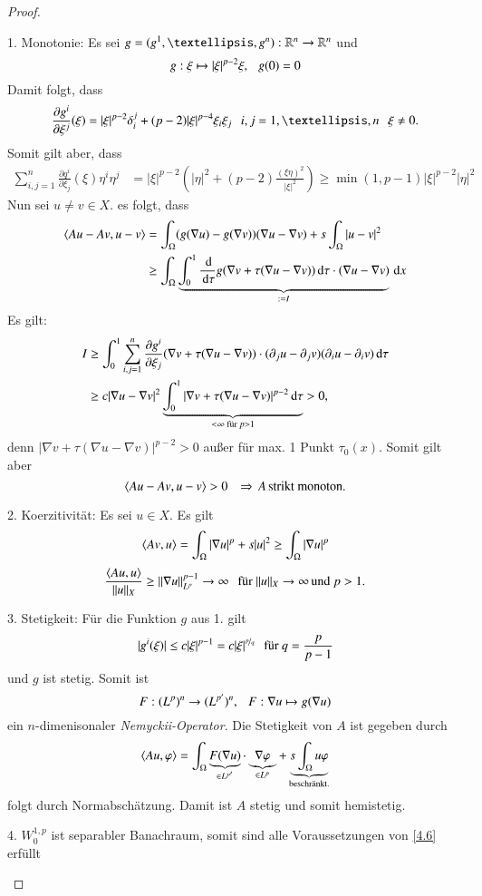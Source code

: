 \begin{proof}
    \begin{description}
    \item{1. Monotonie:}
    Es sei $g=(g^1,…,g^n):\R^n\ra \R^n$ und
    \[
        g:\xi \mapsto |\xi|^{p-2} \xi, \hspace{.25cm} g(0)=0  
    \]
    Damit folgt, dass
    \[
        \frac{\partial g^i}{\partial \xi^j}(\xi)=|\xi|^{p-2} \delta_i^j + (p-2)|\xi|^{p-4}\xi_i\xi_j
        \qq i,j=1,…,n \qq \xi\neq 0.
    \]
    Somit gilt aber, dass
    \begin{align*}
        \sum_{i,j=1}^n \frac{\partial q^i}{\partial \xi _j}(\xi) \eta^i\eta^j&= |\xi|^{p-2}
        \left( |\eta|^2+ (p-2)\frac{(\xi \eta)^2}{|\xi|^2} \right)
        \geq \min(1,p-1) |\xi|^{p-2} |\eta|^2
    \end{align*}
    Nun sei $u\neq v \in X.$ es folgt, dass
    \begin{align*}
        \langle Au-Av,u-v\rangle &= \int_\Omega (g(\nabla u)- g(\nabla v))(\nabla u - \nabla v) + s \int_\Omega
        |u-v|^2\\
            &\geq \int_\Omega \underbrace{\int_0^1 \frac{\, \mathrm{d}}{\, \mathrm{d} \tau} g(\nabla v + \tau(\nabla u -
                        \nabla v)) \, \mathrm{d}\tau\cdot(\nabla u-\nabla v)}_{:= I}  \, \mathrm{d} x\\
    \end{align*}
    Es gilt:
    \begin{align*}
        I&\geq \int_0^1 \sum_{i,j=1}^n\frac{\partial g^i}{\partial\xi_j}(\nabla v + \tau(\nabla u-\nabla v))
        \cdot (\partial_ju-\partial_jv)(\partial_iu-\partial_iv)\, \mathrm{d} \tau\\
        &\geq  c |\nabla u - \nabla v|^2\underbrace{\int_0^1 |\nabla v+\tau(\nabla u -\nabla v)|^{p-2}\, \mathrm{d}\tau}
        _{<\infty \text{ für }p>1} >0,
    \end{align*}
    denn $|\nabla v + \tau (\nabla u - \nabla v)|^{p-2}>0$ außer für max. 1 Punkt $\tau_0(x)$. Somit gilt
    aber
    \[
        \langle Au-Av, u-v \rangle >0 \hspace{.25cm} \Rightarrow \, A \, \text{strikt monoton.}
    \]
    \item{2. Koerzitivität:}
    Es sei $u\in X$. Es gilt
    \[
        \langle Av,u\rangle= \int_\Omega |\nabla u|^p + s|u|^2\geq \int_\Omega |\nabla u|^p
    \]
    \[
        \frac{\langle Au,u \rangle}{\|u\|_X} \geq \|\nabla u\|^{p-1}_{L^p} \rightarrow \infty \hspace{.25cm} \text{für }\|u\|_X
        \rightarrow \infty \, \text{und } p>1.
    \]
    \item{3. Stetigkeit:}
    Für die Funktion $g$ aus 1. gilt
    \[
        |g^i(\xi)|\leq c |\xi|^{p-1} = c |\xi|^{\nicefrac pq} \hspace{.25cm} \text{für } q=\frac{p}{p-1}
    \]
    und $g$ ist stetig. Somit ist 
    \[
        F:(L^p)^n\rightarrow (L^{p'})^n, \hspace{.25cm}  F:\nabla u \mapsto g(\nabla u)
    \]
    ein $n$-dimenisonaler \textit{Nemyckii-Operator}. Die Stetigkeit von $A$ ist gegeben durch
    \[
        \langle Au,\varphi\rangle=\int_\Omega \underbrace{F(\nabla u)}_{\in L^{p'}} \cdot \underbrace{\nabla \varphi}
        _{\in L^p} +\underbrace{s\int_\Omega u \varphi}_{\text{beschränkt.}}
    \]
    folgt durch Normabschätzung. Damit ist $A$ stetig und somit hemistetig.
    \item{4.}
    $W_0^{1,p}$ ist separabler Banachraum, somit sind alle Voraussetzungen von \ref{4.6} erfüllt
    \end{description}
    \[ \]
\end{proof}
